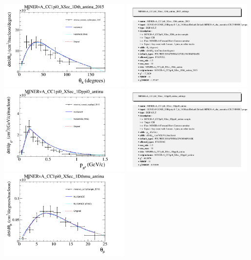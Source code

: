 \documentclass{article}
\begin{document}
\centering
\includegraphics[width=0.49\textwidth]{figures/minerva_numub_ccpi0anglepi_2015_comp.png}
\includegraphics[width=0.49\textwidth]{figures/minerva_numub_ccpi0anglepi_2015_info.png}
\centering
\includegraphics[width=0.49\textwidth]{figures/minerva_numub_ccpi0ppi_2015_comp.png}
\includegraphics[width=0.49\textwidth]{figures/minerva_numub_ccpi0ppi_2015_info.png}
\centering
\includegraphics[width=0.49\textwidth]{figures/minerva_cc1pi0angle_2016_comp.png}
\end{document}
